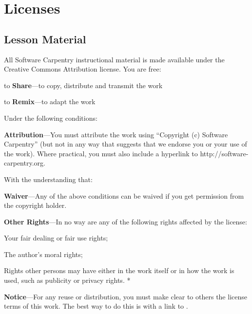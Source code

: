 \documentclass{book}
\begin{document}
\chapter{Licenses}\label{s:license}

\section{Lesson Material}

All Software Carpentry instructional material is made available under
the Creative Commons Attribution license. You are free:

\begin{swcitemize}
\item
  to \textbf{Share}---to copy, distribute and transmit the work
\item
  to \textbf{Remix}---to adapt the work
\end{swcitemize}

Under the following conditions:

\begin{swcitemize}
\item
  \textbf{Attribution}---You must attribute the work using ``Copyright
  (c) Software Carpentry'' (but not in any way that suggests that we
  endorse you or your use of the work). Where practical, you must also
  include a hyperlink to http://software-carpentry.org.
\end{swcitemize}

With the understanding that:

\begin{swcitemize}
\item
  \textbf{Waiver}---Any of the above conditions can be waived if you get
  permission from the copyright holder.
\item
  \textbf{Other Rights}---In no way are any of the following rights
  affected by the license:

  \begin{swcitemize2}
  \item
    Your fair dealing or fair use rights;
  \item
    The author's moral rights;
  \item
    Rights other persons may have either in the work itself or in how
    the work is used, such as publicity or privacy rights. *
   \end{swcitemize2}
\item
  \textbf{Notice}---For any reuse or distribution, you must make clear
  to others the license terms of this work. The best way to do this is
  with a link to
  .
\end{swcitemize}
\end{document}
